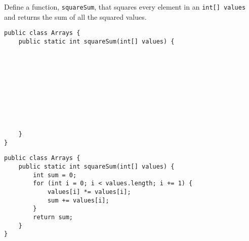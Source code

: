 \begin{blocksection}
\question Define a function, \lstinline$squareSum$, that squares every element
in an \lstinline$int[] values$ and returns the sum of all the squared values.

\ifprintanswers\else
\begin{lstlisting}
public class Arrays {
    public static int squareSum(int[] values) {










    }
}
\end{lstlisting}
\fi

\begin{solution}
\begin{lstlisting}
public class Arrays {
    public static int squareSum(int[] values) {
        int sum = 0;
        for (int i = 0; i < values.length; i += 1) {
            values[i] *= values[i];
            sum += values[i];
        }
        return sum;
    }
}
\end{lstlisting}
\end{solution}
\end{blocksection}
